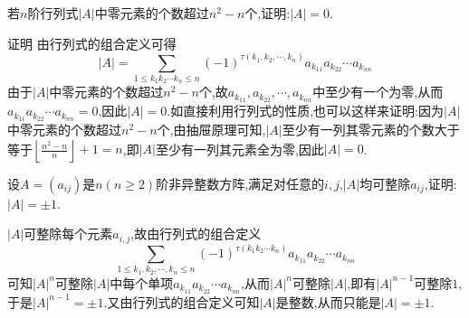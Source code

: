 \documentclass[lang=cn,newtx,10pt,scheme=chinese]{elegantbook}
\begin{document}
\begin{exercise}
    若\(n\)阶行列式\(\vert A\vert\)中零元素的个数超过\(n^2 - n\)个,证明:\(\vert A\vert = 0\).
\end{exercise}
\begin{solution}
    证明 由行列式的组合定义可得
\[
|A|=\sum_{1\leq k_1k_2\cdots k_n\leq n}(-1)^{\tau (k_1,k_2,\cdots,k_n)}a_{k_{11}}a_{k_{22}}\cdots a_{k_{nn}}
\]
由于\(|A|\)中零元素的个数超过\(n^2 - n\)个,故\(a_{k_{11}},a_{k_{22}},\cdots,a_{k_{nn}}\)中至少有一个为零,从而\(a_{k_{11}}a_{k_{22}}\cdots a_{k_{nn}} = 0\),因此\(|A| = 0\).如直接利用行列式的性质,也可以这样来证明:因为\(|A|\)中零元素的个数超过\(n^2 - n\)个,由抽屉原理可知,\(|A|\)至少有一列其零元素的个数大于等于\(\left\lfloor\frac{n^2 - n}{n}\right\rfloor+ 1=n\),即\(|A|\)至少有一列其元素全为零,因此\(|A| = 0\).
\end{solution}

\begin{exercise}
    设\(A=(a_{ij})\)是\(n(n\geq2)\)阶非异整数方阵,满足对任意的\(i,j\),\(\vert A\vert\)均可整除\(a_{ij}\),证明:\(\vert A\vert=\pm1\).
\end{exercise}
\begin{solution}
    \(\vert A\vert\)可整除每个元素\(a_{i,j}\),故由行列式的组合定义
\[
\sum_{1\le k_1,k_2,\cdots ,k_n\le n}{\left( -1 \right) ^{\tau \left( k_1k_2\cdots k_n \right)}a_{k_{11}}a_{k_{22}}\cdots a_{k_{nn}}}
\]
可知\(\vert A\vert^n\)可整除\(\vert A\vert\)中每个单项\(a_{k_{11}}a_{k_{22}}\cdots a_{k_{nn}}\),从而\(\vert A\vert^n\)可整除\(\vert A\vert\),即有\(\vert A\vert^{n - 1}\)可整除\(1\),于是\(\vert A\vert^{n - 1}=\pm1\).又由行列式的组合定义可知\(\vert A\vert\)是整数,从而只能是\(\vert A\vert=\pm1\).
\end{solution}
\end{document}
